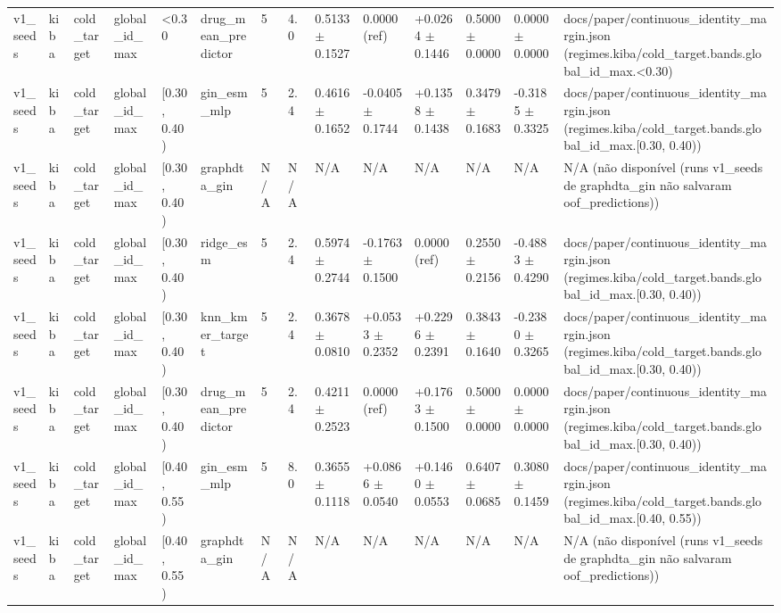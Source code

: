 \begin{table}[htbp]
\begin{tabular}{llllllllllllll}
v1\_seeds & kiba & cold\_target & global\_id\_max & <0.30 & drug\_mean\_predictor & 5 & 4.0 & 0.5133 $\pm$ 0.1527 & 0.0000 (ref) & +0.0264 $\pm$ 0.1446 & 0.5000 $\pm$ 0.0000 & 0.0000 $\pm$ 0.0000 & docs/paper/continuous\_identity\_margin.json (regimes.kiba/cold\_target.bands.global\_id\_max.<0.30) \\
v1\_seeds & kiba & cold\_target & global\_id\_max & [0.30, 0.40) & gin\_esm\_mlp & 5 & 2.4 & 0.4616 $\pm$ 0.1652 & -0.0405 $\pm$ 0.1744 & +0.1358 $\pm$ 0.1438 & 0.3479 $\pm$ 0.1683 & -0.3185 $\pm$ 0.3325 & docs/paper/continuous\_identity\_margin.json (regimes.kiba/cold\_target.bands.global\_id\_max.[0.30, 0.40)) \\
v1\_seeds & kiba & cold\_target & global\_id\_max & [0.30, 0.40) & graphdta\_gin & N/A & N/A & N/A & N/A & N/A & N/A & N/A & N/A (não disponível (runs v1\_seeds de graphdta\_gin não salvaram oof\_predictions)) \\
v1\_seeds & kiba & cold\_target & global\_id\_max & [0.30, 0.40) & ridge\_esm & 5 & 2.4 & 0.5974 $\pm$ 0.2744 & -0.1763 $\pm$ 0.1500 & 0.0000 (ref) & 0.2550 $\pm$ 0.2156 & -0.4883 $\pm$ 0.4290 & docs/paper/continuous\_identity\_margin.json (regimes.kiba/cold\_target.bands.global\_id\_max.[0.30, 0.40)) \\
v1\_seeds & kiba & cold\_target & global\_id\_max & [0.30, 0.40) & knn\_kmer\_target & 5 & 2.4 & 0.3678 $\pm$ 0.0810 & +0.0533 $\pm$ 0.2352 & +0.2296 $\pm$ 0.2391 & 0.3843 $\pm$ 0.1640 & -0.2380 $\pm$ 0.3265 & docs/paper/continuous\_identity\_margin.json (regimes.kiba/cold\_target.bands.global\_id\_max.[0.30, 0.40)) \\
v1\_seeds & kiba & cold\_target & global\_id\_max & [0.30, 0.40) & drug\_mean\_predictor & 5 & 2.4 & 0.4211 $\pm$ 0.2523 & 0.0000 (ref) & +0.1763 $\pm$ 0.1500 & 0.5000 $\pm$ 0.0000 & 0.0000 $\pm$ 0.0000 & docs/paper/continuous\_identity\_margin.json (regimes.kiba/cold\_target.bands.global\_id\_max.[0.30, 0.40)) \\
v1\_seeds & kiba & cold\_target & global\_id\_max & [0.40, 0.55) & gin\_esm\_mlp & 5 & 8.0 & 0.3655 $\pm$ 0.1118 & +0.0866 $\pm$ 0.0540 & +0.1460 $\pm$ 0.0553 & 0.6407 $\pm$ 0.0685 & 0.3080 $\pm$ 0.1459 & docs/paper/continuous\_identity\_margin.json (regimes.kiba/cold\_target.bands.global\_id\_max.[0.40, 0.55)) \\
v1\_seeds & kiba & cold\_target & global\_id\_max & [0.40, 0.55) & graphdta\_gin & N/A & N/A & N/A & N/A & N/A & N/A & N/A & N/A (não disponível (runs v1\_seeds de graphdta\_gin não salvaram oof\_predictions)) \\

\end{tabular}
\end{table}
